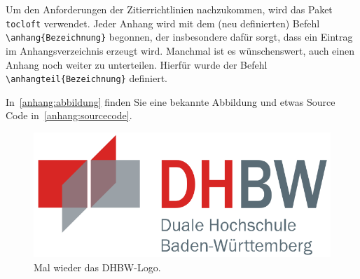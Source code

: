 \startAnhang

\listofanhang
\clearpage




Um den Anforderungen der Zitierrichtlinien nachzukommen, wird das Paket \verb|tocloft| verwendet. Jeder Anhang wird mit dem (neu definierten) Befehl \lstinline|\anhang{Bezeichnung}| begonnen, der insbesondere dafür sorgt, dass ein Eintrag im Anhangsverzeichnis erzeugt wird. Manchmal ist es wünschenswert, auch einen Anhang noch weiter zu unterteilen. Hierfür wurde der Befehl \lstinline|\anhangteil{Bezeichnung}| definiert.

In~\ref{anhang:abbildung} finden Sie eine bekannte Abbildung und etwas Source Code in~\ref{anhang:sourcecode}. 

\label{anhang:abbildung}
\begin{figure}[htb]
\centering
\includegraphics[width=0.9\linewidth]{graphics/dhbw.png}
\caption{Mal wieder das DHBW-Logo.}
\end{figure}

\label{anhang:sourcecode}


